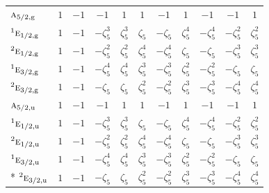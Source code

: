 \documentclass[10pt,a4paper]{article}
\makeatletter
\def\grouprule#1#2{\noalign{\marks\LTgroupmarks{\the\belowrulesep}\nobreak\vskip#1%
  \vskip\aboverulesep}\multispan\LT@cols\unskip{\leaders\hrule\@height#2\hfill\kern\z@}\cr
  \noalign{\penalty\LTrulebreak\vskip\belowrulesep\global\@lastruleclass\z@}}
\numberwithin{equation}{section}
\newcommand{\irr}[1]{\text{\normalfont\scshape #1}}
\newcommand{\conjpair}[1]{{}^{#1}}
\newcommand{\ptag}[1]{\mathrm{#1}}
\newcommand{\rootunity}[1]{\zeta_{#1}}
\makeatother
\begin{document}
{\begin{longtable}{@{}lcccccccccc@{}}
\grouprule{0pt}{\lightrulewidth}
$\irr{a}_{5/2,\ptag{g}}$ & $1$ & $-1$ & $-1$ & $1$ & $1$ & $-1$ & $1$ & $-1$ & $-1$ & $1$\\
$\conjpair{1}\irr{e}_{1/2,\ptag{g}}$ & $1$ & $-1$ & $-\rootunity{5}^{3}$ & $\rootunity{5}^{3}$ & $\rootunity{5}$ & $-\rootunity{5}$ & $\rootunity{5}^{4}$ & $-\rootunity{5}^{4}$ & $-\rootunity{5}^{2}$ & $\rootunity{5}^{2}$\\
$\conjpair{2}\irr{e}_{1/2,\ptag{g}}$ & $1$ & $-1$ & $-\rootunity{5}^{2}$ & $\rootunity{5}^{2}$ & $\rootunity{5}^{4}$ & $-\rootunity{5}^{4}$ & $\rootunity{5}$ & $-\rootunity{5}$ & $-\rootunity{5}^{3}$ & $\rootunity{5}^{3}$\\
$\conjpair{1}\irr{e}_{3/2,\ptag{g}}$ & $1$ & $-1$ & $-\rootunity{5}^{4}$ & $\rootunity{5}^{4}$ & $\rootunity{5}^{3}$ & $-\rootunity{5}^{3}$ & $\rootunity{5}^{2}$ & $-\rootunity{5}^{2}$ & $-\rootunity{5}$ & $\rootunity{5}$\\
$\conjpair{2}\irr{e}_{3/2,\ptag{g}}$ & $1$ & $-1$ & $-\rootunity{5}$ & $\rootunity{5}$ & $\rootunity{5}^{2}$ & $-\rootunity{5}^{2}$ & $\rootunity{5}^{3}$ & $-\rootunity{5}^{3}$ & $-\rootunity{5}^{4}$ & $\rootunity{5}^{4}$\\
$\irr{a}_{5/2,\ptag{u}}$ & $1$ & $-1$ & $-1$ & $1$ & $1$ & $-1$ & $1$ & $-1$ & $-1$ & $1$\\
$\conjpair{1}\irr{e}_{1/2,\ptag{u}}$ & $1$ & $-1$ & $-\rootunity{5}^{3}$ & $\rootunity{5}^{3}$ & $\rootunity{5}$ & $-\rootunity{5}$ & $\rootunity{5}^{4}$ & $-\rootunity{5}^{4}$ & $-\rootunity{5}^{2}$ & $\rootunity{5}^{2}$\\
$\conjpair{2}\irr{e}_{1/2,\ptag{u}}$ & $1$ & $-1$ & $-\rootunity{5}^{2}$ & $\rootunity{5}^{2}$ & $\rootunity{5}^{4}$ & $-\rootunity{5}^{4}$ & $\rootunity{5}$ & $-\rootunity{5}$ & $-\rootunity{5}^{3}$ & $\rootunity{5}^{3}$\\
$\conjpair{1}\irr{e}_{3/2,\ptag{u}}$ & $1$ & $-1$ & $-\rootunity{5}^{4}$ & $\rootunity{5}^{4}$ & $\rootunity{5}^{3}$ & $-\rootunity{5}^{3}$ & $\rootunity{5}^{2}$ & $-\rootunity{5}^{2}$ & $-\rootunity{5}$ & $\rootunity{5}$\\*
$\conjpair{2}\irr{e}_{3/2,\ptag{u}}$ & $1$ & $-1$ & $-\rootunity{5}$ & $\rootunity{5}$ & $\rootunity{5}^{2}$ & $-\rootunity{5}^{2}$ & $\rootunity{5}^{3}$ & $-\rootunity{5}^{3}$ & $-\rootunity{5}^{4}$ & $\rootunity{5}^{4}$\\
\bottomrule\end{longtable}}
\end{document}
